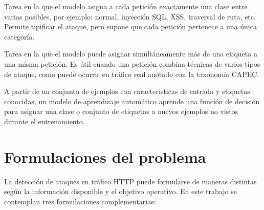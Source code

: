 \documentclass[12pt,oneside]{report}
\begin{document}
\begin{description}[leftmargin=0pt, labelindent=0pt]
  \item[\textbf{Clasificación multiclase.}]
  Tarea en la que el modelo asigna a cada petición exactamente una clase entre varias posibles, por ejemplo: normal, inyección SQL, XSS, traversal de ruta, etc. Permite tipificar el ataque, pero supone que cada petición pertenece a una única categoría.

  \item[\textbf{Clasificación multietiqueta.}]
  Tarea en la que el modelo puede asignar simultáneamente más de una etiqueta a una misma petición. Es útil cuando una petición combina técnicas de varios tipos de ataque, como puede ocurrir en tráfico real anotado con la taxonomía CAPEC.

  \item[\textbf{Modelo de \textit{Machine Learning} (aprendizaje automático).}]
  A partir de un conjunto de ejemplos con características de entrada y etiquetas conocidas, un modelo de aprendizaje automático aprende una función de decisión para asignar una clase o conjunto de etiquetas a nuevos ejemplos no vistos durante el entrenamiento.

\end{description}

\section{Formulaciones del problema}

La detección de ataques en tráfico HTTP puede formularse de maneras distintas según la información disponible y el objetivo operativo. En este trabajo se contemplan tres formulaciones complementarias:
\end{document}

